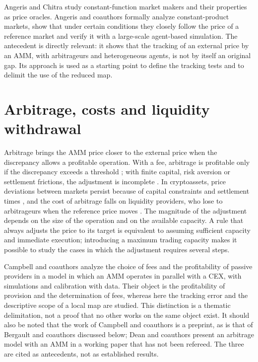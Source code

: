 Angeris and Chitra \cite{angeris2020cfmm} study constant-function market makers and their properties as price oracles. Angeris and coauthors \cite{angeris2020uniswap} formally analyze constant-product markets, show that under certain conditions they closely follow the price of a reference market and verify it with a large-scale agent-based simulation. The antecedent is directly relevant: it shows that the tracking of an external price by an AMM, with arbitrageurs and heterogeneous agents, is not by itself an original gap. Its approach is used as a starting point to define the tracking tests and to delimit the use of the reduced map.

\section{Arbitrage, costs and liquidity withdrawal}

Arbitrage brings the AMM price closer to the external price when the discrepancy allows a profitable operation. With a fee, arbitrage is profitable only if the discrepancy exceeds a threshold \cite{milionis2025fees}; with finite capital, risk aversion or settlement frictions, the adjustment is incomplete \cite{shleifer1997limits}. In cryptoassets, price deviations between markets persist because of capital constraints and settlement times \cite{makarov2020trading,hautsch2024building}, and the cost of arbitrage falls on liquidity providers, who lose to arbitrageurs when the reference price moves \cite{milionis2022lvr}. The magnitude of the adjustment depends on the size of the operation and on the available capacity. A rule that always adjusts the price to its target is equivalent to assuming sufficient capacity and immediate execution; introducing a maximum trading capacity makes it possible to study the cases in which the adjustment requires several steps.

Campbell and coauthors \cite{campbell2025optimal} analyze the choice of fees and the profitability of passive providers in a model in which an AMM operates in parallel with a CEX, with simulations and calibration with data. Their object is the profitability of provision and the determination of fees, whereas here the tracking error and the descriptive scope of a local map are studied. This distinction is a thematic delimitation, not a proof that no other works on the same object exist. It should also be noted that the work of Campbell and coauthors is a preprint, as is that of Bergault and coauthors \cite{bergault2025exit} discussed below; Dean and coauthors \cite{dean2022arbitrage} present an arbitrage model with an AMM in a working paper that has not been refereed. The three are cited as antecedents, not as established results.

